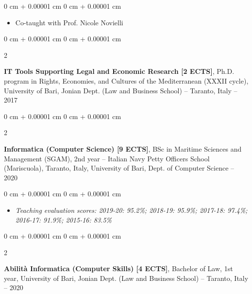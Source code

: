 \documentclass[10pt, a4paper]{article}
\newenvironment{highlights}{
    \begin{itemize}[
        topsep=0.10 cm,
        parsep=0.10 cm,
        partopsep=0pt,
        itemsep=0pt,
        leftmargin=0 cm + 10pt
    ]
}{
    \end{itemize}
} %
\newenvironment{onecolentry}{
    \begin{adjustwidth}{
        0 cm + 0.00001 cm
    }{
        0 cm + 0.00001 cm
    }
}{
    \end{adjustwidth}
} %
\newenvironment{twocolentry}[2][]{
    \onecolentry
    \def\secondColumn{#2}
    \setcolumnwidth{\fill, 4.5 cm}
    \begin{paracol}{2}
}{
    \switchcolumn \raggedleft \secondColumn
    \end{paracol}
    \endonecolentry
} %
\begin{document}
        \vspace{0.10 cm}
        \begin{onecolentry}
            \begin{highlights}
                \item Co-taught with Prof. Nicole Novielli
            \end{highlights}
        \end{onecolentry}


        \vspace{0.2 cm}

        \begin{twocolentry}{
            2016 – 2017
        }
            \textbf{IT Tools Supporting Legal and Economic Research [2 ECTS]}, Ph.D. program in Rights, Economies, and Cultures of the Mediterranean (XXXII cycle), University of Bari, Jonian Dept. (Law and Business School) -- Taranto, Italy\end{twocolentry}



        \vspace{0.2 cm}

        \begin{twocolentry}{
            2015 – 2020
        }
            \textbf{Informatica (Computer Science) [9 ECTS]}, BSc in Maritime Sciences and Management (SGAM), 2nd year -- Italian Navy Petty Officers School (Mariscuola), Taranto, Italy, University of Bari, Dept. of Computer Science\end{twocolentry}

        \vspace{0.10 cm}
        \begin{onecolentry}
            \begin{highlights}
                \item \textit{Teaching evaluation scores: 2019-20: 95.2\%; 2018-19: 95.9\%; 2017-18: 97.4\%; 2016-17: 91.9\%; 2015-16: 83.5\%}
            \end{highlights}
        \end{onecolentry}


        \vspace{0.2 cm}

        \begin{twocolentry}{
            2015 – 2020
        }
            \textbf{Abilità Informatica (Computer Skills) [4 ECTS]}, Bachelor of Law, 1st year, University of Bari, Jonian Dept. (Law and Business School) -- Taranto, Italy\end{twocolentry}
\end{document}

